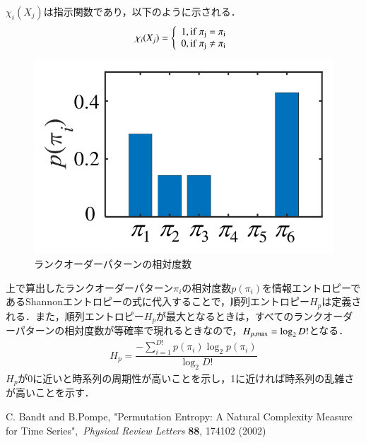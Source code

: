 \documentclass[autodetect-engine,dvipdfmx-if-dvi,ja=standard,a4paper,11pt]{bxjsarticle} %
\begin{document}
$\chi_{i}(X_{j})$は指示関数であり，以下のように示される．
\begin{eqnarray}
\chi_{i}(X_{j})=
\left\lbrace 
\begin{array}{l}
1, \rm{if} ~\pi_j=\pi_{i} \\
0, \rm{if} ~\pi_j \neq \pi_{i} 
\end{array}
\right.
\end{eqnarray}
\begin{figure}[H]
\begin{center}
\includegraphics[width=.6\textwidth]{crop_PE3.pdf} 
\end{center}
\caption{ランクオーダーパターンの相対度数}%
\label{PE3}
\end{figure}
上で算出したランクオーダーパターン$\pi_i$の相対度数$p(\pi_i)$を情報エントロピーであるShannonエントロピーの式に代入することで，順列エントロピー$ H_p $は定義される．また，順列エントロピー$ H_p $が最大となるときは，すべてのランクオーダーパターンの相対度数が等確率で現れるときなので，$ H_{p,{\rm max}}=\log_2 D! $となる．
\begin{eqnarray}
H_p=\dfrac{-\displaystyle\sum_{i=1}^{D!} p(\pi_i) \log_2 p(\pi_i)}{\log_2 D!}
\end{eqnarray}
$H_p$が0に近いと時系列の周期性が高いことを示し，1に近ければ時系列の乱雑さが高いことを示す．



\begin{thebibliography}{9}
 C. Bandt and B.Pompe, "Permutation Entropy: A Natural Complexity Measure
for Time Series",~\textit{Physical Review Letters} \textbf{88}, 174102 (2002)
\end{thebibliography}
\end{document}
